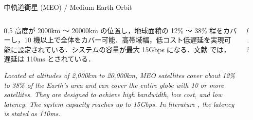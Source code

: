 \documentclass[11pt, aspectratio=169]{beamer}
\begin{document}
\begin{frame}[c]{中軌道衛星 (MEO) / Medium Earth Orbit}
  \begin{columns}[c]
    \begin{column}{0.5\textwidth}
      \small
      高度が 2000km ～ 20000km の位置し，地球面積の 12\% ～ 38\% 程をカバーし，10 機以上で全体をカバー可能．高帯域幅，低コスト低遅延を実現可能に設定されている．システムの容量が最大 15Gbps になる．文献 \cite{chen2023space} では，遅延は 110ms とされている．

      \vspace{1em}
      \textit{Located at altitudes of 2,000km to 20,000km, MEO satellites cover about 12\% to 38\% of the Earth's area and can cover the entire globe with 10 or more satellites. They are designed to achieve high bandwidth, low cost, and low latency. The system capacity reaches up to 15Gbps. In literature \cite{chen2023space}, the latency is stated as 110ms.}
    \end{column}

    \begin{column}{0.5\textwidth}
      \begin{center}
      \end{center}
    \end{column}
  \end{columns}
\end{frame}
\end{document}
